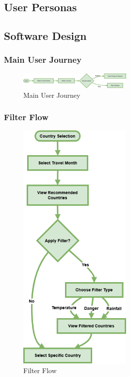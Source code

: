 \documentclass[]{project_final}
\begin{document}
\subsection{User Personas}
\subsection{Software Design}
\subsubsection{Main User Journey}

\begin{figure}[ht!]
  \centering
  \includegraphics[width=0.5\textwidth]{TPMainUserJourney.drawio.png}
  \vspace*{0.0cm}
  \caption{Main User Journey}
  \label{fig:1}
\end{figure}

\newpage
\subsubsection{Filter Flow}

\begin{figure}[ht!]
  \centering
  \includegraphics[width=0.5\textwidth]{TPFilterFlow.png}
  \vspace*{0.0cm}
  \caption{Filter Flow}
  \label{fig:1}
\end{figure}
\end{document}
